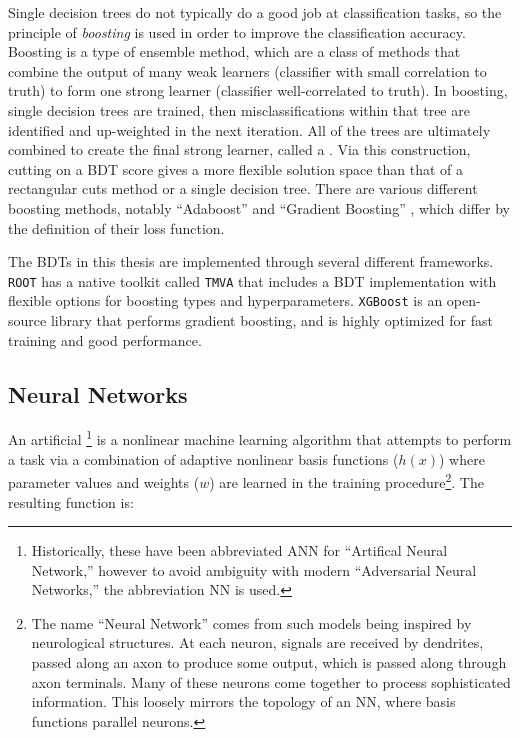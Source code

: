 Single decision trees do not typically do a good job at classification tasks, so the principle of \textit{boosting} is used in order to improve the classification accuracy. Boosting is a type of ensemble method, which are a class of methods that combine the output of many weak learners (classifier with small correlation to truth) to form one strong learner (classifier well-correlated to truth). In boosting, single decision trees are trained, then misclassifications within that tree are identified and up-weighted in the next iteration. All of the trees are ultimately combined to create the final strong learner, called a . Via this construction, cutting on a \gls{BDT} score gives a more flexible solution space than that of a rectangular cuts method or a single decision tree. There are various different boosting methods, notably ``Adaboost'' \cite{adaboost} and ``Gradient Boosting'' \cite{gradBoost}, which differ by the definition of their loss function.

The \glspl{BDT} in this thesis are implemented through several different frameworks. \texttt{ROOT} \cite{ROOT} has a native toolkit called \texttt{TMVA} \cite{TMVA} that includes a \gls{BDT} implementation with flexible options for boosting types and hyperparameters. \texttt{XGBoost} \cite{XGBoost} is an open-source library that performs gradient boosting, and is highly optimized for fast training and good performance.


\subsection{Neural Networks}\label{ssec:nn}

An artificial \footnote{Historically, these have been abbreviated ANN for ``Artifical Neural Network,'' however to avoid ambiguity with modern ``Adversarial Neural Networks,'' the abbreviation NN is used.} is a nonlinear machine learning algorithm that attempts to perform a task via a combination of adaptive nonlinear basis functions ($h(x)$) where parameter values and weights ($w$) are learned in the training procedure\footnote{The name ``Neural Network'' comes from such models being inspired by neurological structures. At each neuron, signals are received by dendrites, passed along an axon to produce some output, which is passed along through axon terminals. Many of these neurons come together to process sophisticated information. This loosely mirrors the topology of an \gls{NN}, where basis functions parallel neurons.}. The resulting function is:

